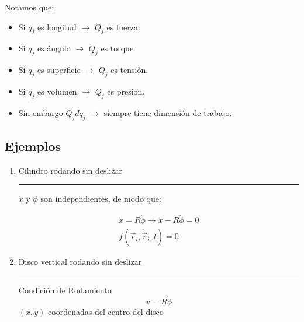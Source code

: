 \documentclass[../main]{subfiles}
\begin{document}
Notamos que:


\begin{itemize}
    \item Si $q_j$ es longitud $\rightarrow$ $Q_j$ es fuerza.
    \item Si $q_j$ es ángulo $\rightarrow$ $Q_j$ es torque.
    \item Si $q_j$ es superficie $\rightarrow$ $Q_j$ es tensión.
    \item Si $q_j$ es volumen $\rightarrow$ $Q_j$ es presión.
    \item Sin embargo $Q_jdq_j$ $\rightarrow$ siempre tiene dimensión de trabajo.
\end{itemize}

\subsection*{Ejemplos}
\begin{enumerate}
    \item Cilindro rodando sin deslizar

    \noindent\begin{minipage}{.45\textwidth}
  \centering
  \rule{4cm}{3cm}
  \label{fig:figure}
    \end{minipage}
    \begin{minipage}{.45\textwidth}
    $x$ y $\phi$ son independientes, de modo que:
    
    \begin{align*}
        \dot{x}=R \dot{\phi} \rightarrow \dot{x}-R \dot{\phi}=0 \\
        f(\vec{r}_i,\dot{\vec{r}}_i,t)=0
    \end{align*}
    \end{minipage}
    
    \item Disco vertical rodando sin deslizar

    \noindent\begin{minipage}{.45\textwidth}
  \centering
  \rule{4cm}{3cm}
  \label{fig:figure}
    \end{minipage}
    \begin{minipage}{.45\textwidth}
    Condición de Rodamiento
    $$
    v=R \dot{\phi}
    $$
    $(x,y)$ coordenadas del centro del disco
    \end{minipage}
\end{enumerate}
\end{document}
